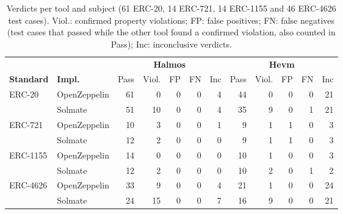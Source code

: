 \begin{table}[htbp]
\centering
\begin{scriptsize}
\begin{tabular}{llrrrrrrrrrr}
\toprule
 & & \multicolumn{5}{c}{\textbf{Halmos}} & \multicolumn{5}{c}{\textbf{Hevm}} \\
\cmidrule(lr){3-7}\cmidrule(lr){8-12}
\textbf{Standard} & \textbf{Impl.} & Pass & Viol. & FP & FN & Inc & Pass & Viol. & FP & FN & Inc \\
\midrule
ERC-20 & OpenZeppelin & 61 & 0 & 0 & 0 & 4 & 44 & 0 & 0 & 0 & 21 \\
 & Solmate & 51 & 10 & 0 & 0 & 4 & 35 & 9 & 0 & 1 & 21 \\
\addlinespace
ERC-721 & OpenZeppelin & 10 & 3 & 0 & 0 & 1 & 9 & 1 & 1 & 0 & 3 \\
 & Solmate & 12 & 2 & 0 & 0 & 0 & 9 & 1 & 1 & 0 & 3 \\
\addlinespace
ERC-1155 & OpenZeppelin & 14 & 0 & 0 & 0 & 0 & 10 & 1 & 0 & 0 & 3 \\
 & Solmate & 12 & 2 & 0 & 0 & 0 & 10 & 2 & 0 & 1 & 2 \\
\addlinespace
ERC-4626 & OpenZeppelin & 33 & 9 & 0 & 0 & 4 & 21 & 1 & 0 & 0 & 24 \\
 & Solmate & 24 & 15 & 0 & 0 & 7 & 16 & 9 & 0 & 0 & 21 \\
\bottomrule
\end{tabular}
\end{scriptsize}
\caption{Verdicts per tool and subject (61 ERC-20, 14 ERC-721, 14 ERC-1155 and 46 ERC-4626 test cases). Viol.: confirmed property violations; FP: false positives; FN: false negatives (test cases that passed while the other tool found a confirmed violation, also counted in Pass); Inc: inconclusive verdicts.}
\label{tab:test_results}
\end{table}
